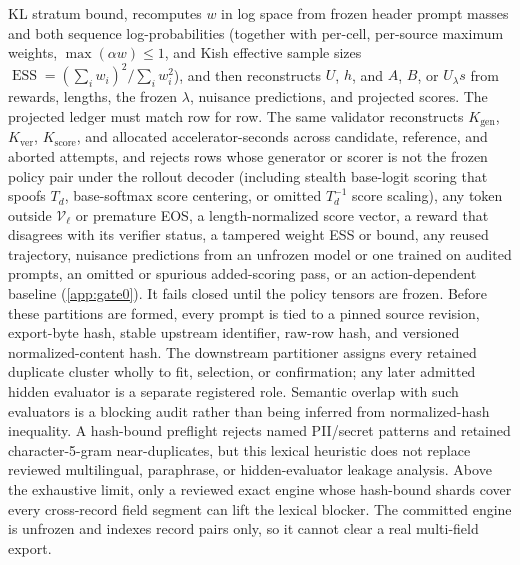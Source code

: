 \documentclass{article}
\begin{document}
KL stratum bound, recomputes $w$ in log space from frozen header prompt masses
and both sequence log-probabilities (together with per-cell, per-source
maximum weights, $\max(\alpha w)\le1$, and Kish effective sample sizes
$\operatorname{ESS}=(\sum_iw_i)^2/\sum_iw_i^2$), and then reconstructs $U$, $h$, and $A$,
$B$, or $U_\lambda s$ from rewards, lengths, the frozen $\lambda$, nuisance
predictions, and projected scores. The projected ledger must match row for row.
The same validator reconstructs
$K_{\mathrm{gen}}$, $K_{\mathrm{ver}}$, $K_{\mathrm{score}}$, and allocated
accelerator-seconds across candidate, reference, and aborted attempts, and
rejects rows whose generator or scorer is not the frozen policy pair under the rollout
decoder (including stealth base-logit scoring that spoofs $T_d$, base-softmax
score centering, or omitted $T_d^{-1}$ score scaling), any token
outside $\mathcal V_\ell$ or premature EOS, a length-normalized score vector, a
reward that disagrees with its verifier status, a tampered weight ESS or bound, any reused trajectory, nuisance
predictions from an unfrozen model or one trained on audited prompts, an
omitted or spurious added-scoring pass, or
an action-dependent baseline (\cref{app:gate0}). It fails closed until the
policy tensors are frozen.
Before these partitions are formed, every prompt is tied to a pinned source
revision, export-byte hash, stable upstream identifier, raw-row hash, and
versioned normalized-content hash. The downstream partitioner assigns every
retained duplicate cluster wholly to fit, selection, or confirmation; any
later admitted hidden evaluator is a separate registered role. Semantic
overlap with such evaluators is a blocking audit rather than being inferred
from normalized-hash inequality. A hash-bound preflight rejects named
PII/secret patterns and retained character-5-gram near-duplicates, but this
lexical heuristic does not replace reviewed multilingual, paraphrase, or
hidden-evaluator leakage analysis. Above the exhaustive limit, only a reviewed
exact engine whose hash-bound shards cover every cross-record field segment
can lift the lexical blocker. The committed engine is unfrozen and indexes
record pairs only, so it cannot clear a real multi-field export.
\end{document}
